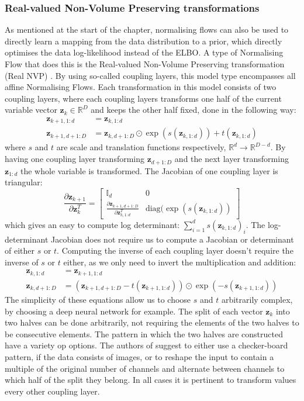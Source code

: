 \documentclass{report}
\newcommand{\eye}{\mathbb{I}}
\newcommand{\R}{\mathbb{R}}
\newcommand{\bz}{\mathbf{z}}
\newcommand{\parfrac}[2]{\frac{\partial #1}{\partial#2}}
\begin{document}
\subsubsection{Real-valued Non-Volume Preserving transformations}
As mentioned at the start of the chapter, normalising flows can also be used to directly learn a mapping from the data distribution to a prior, which directly optimises the data log-likelihood instead of the ELBO. A type of Normalising Flow that does this is the Real-valued Non-Volume Preserving transformation (Real NVP) \parencite{dinh2016density}. By using so-called coupling layers, this model type encompasses all affine Normalising Flows. Each transformation in this model consists of two coupling layers, where each coupling layers transforms one half of the current variable vector $\bz_k \in \R^D$ and keeps the other half fixed, done in the following way:
\begin{align}\label{equation:real_nvp_coupling}
    \bz_{k+1, 1:d} &= \bz_{k, 1:d} \\
    \bz_{k+1, d+1:D} &= \bz_{k, d+1:D} \odot \exp \left(s(\bz_{k, 1:d}) \right) + t(\bz_{k, 1:d})
\end{align}
where $s$ and $t$ are scale and translation functions respectively, $\R^{d} \rightarrow \R^{D-d}$. By having one coupling layer transforming $\bz_{d+1:D}$ and the next layer transforming $\bz_{1:d}$ the whole variable is transformed. The Jacobian of one coupling layer is triangular:
\begin{equation}
    \parfrac{\bz_{k+1}}{\bz_k^T} = \begin{bmatrix}
    \eye_d & 0\\
    \parfrac{\bz_{k+1, d+1:D}}{\bz_{k, 1:d}^T} & \text{diag}(\exp(s(\bz_{k, 1:d}))
    \end{bmatrix}
\end{equation}
which gives an easy to compute log determinant: $\sum\limits^d_{i=1} s(\bz_{k, 1:d})_i$. The log-determinant Jacobian  does not require us to compute a Jacobian or determinant of either $s$ or $t$. Computing the inverse of each coupling layer doesn't require the inverse of $s$ or $t$ either, as we only need to invert the multiplication and addition:
\begin{align}\label{equation:real_nvp_coupling_inverse}
    \bz_{k, 1:d} &= \bz_{k+1, 1:d} \\
    \bz_{k, d+1:D} &= (\bz_{k+1, d+1:D} - t(\bz_{k+1, 1:d})) \odot \exp \left(- s(\bz_{k+1, 1:d}) \right) 
\end{align}
The simplicity of these equations allow us to choose $s$ and $t$ arbitrarily complex, by choosing a deep neural network for example. The split of each vector $\bz_k$ into two halves can be done arbitrarily, not requiring the elements of the two halves to be consecutive elements. The pattern in which the two halves are constructed have a variety op options. The authors of \textcite{dinh2016density} suggest to  either use a checker-board pattern, if the data consists of images, or to reshape the input to contain a multiple of the original number of channels and alternate between channels to which half of the split they belong. In all cases it is pertinent to transform values every other coupling layer.
\end{document}
